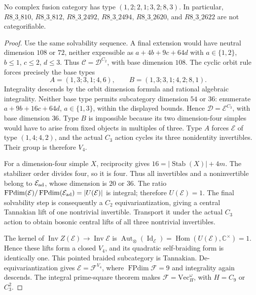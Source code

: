 \begin{theorem}\label{thm:m3-dimension216}
No complex fusion category has type $(1,2;2,1;3,2;8,3)$.
In particular, $R8\_3\_810$, $R8\_3\_812$, $R8\_3\_2492$,
$R8\_3\_2494$, $R8\_3\_2620$, and $R8\_3\_2622$ are not categorifiable.
\end{theorem}
\begin{proof}
Use the same solvability sequence. A final extension would have neutral
dimension $108$ or $72$, neither expressible as $a+4b+9c+64d$ with
$a\in\{1,2\}$, $b\le1$, $c\le2$, $d\le3$. Thus
$\mathcal C=\mathcal D^{C_2}$, with base dimension $108$.
The cyclic orbit rule forces precisely the base types
\[
 A=(1,3;3,1;4,6),\qquad B=(1,3;3,1;4,2;8,1).
\]
Integrality descends by the orbit dimension formula and rational
algebraic integrality. Neither base type permits subcategory dimension
$54$ or $36$: enumerate $a+9b+16c+64d$, $a\in\{1,3\}$, within the
displayed bounds. Hence $\mathcal D=\mathcal E^{C_3}$, with base
dimension $36$. Type $B$ is impossible because its two dimension-four
simples would have to arise from fixed objects in multiples of three.
Type $A$ forces $\mathcal E$ of type $(1,4;4,2)$, and the actual
$C_3$ action cycles its three nonidentity invertibles. Their group is
therefore $V_4$.

For a dimension-four simple $X$, reciprocity gives
$16=|\operatorname{Stab}(X)|+4m$. The stabilizer order divides four,
so it is four. Thus all invertibles and a noninvertible belong to
$\mathcal E_{\rm ad}$, whose dimension is $20$ or $36$.
The ratio $\operatorname{FPdim}(\mathcal E)/
\operatorname{FPdim}(\mathcal E_{\rm ad})=|U(\mathcal E)|$ is integral;
therefore $U(\mathcal E)=1$.
The final solvability step is consequently a $C_2$ equivariantization,
giving a central Tannakian lift of one nontrivial invertible. Transport
it under the actual $C_3$ action to obtain bosonic central lifts of all
three nontrivial invertibles.

The kernel of $\operatorname{Inv}Z(\mathcal E)\to
\operatorname{Inv}\mathcal E$ is
$\operatorname{Aut}_{\otimes}(\operatorname{Id}_{\mathcal E})
=\operatorname{Hom}(U(\mathcal E),\mathbb C^\times)=1$.
Hence these lifts form a closed $V_4$, and its quadratic self-braiding
form is identically one. This pointed braided subcategory is Tannakian.
De-equivariantization gives $\mathcal E=\mathcal F^{V_4}$, where
$\operatorname{FPdim}\mathcal F=9$ and integrality again descends.
The integral prime-square theorem \cite{ENO,EGNO} makes
$\mathcal F=\mathrm{Vec}_H^\omega$, with $H=C_9$ or $C_3^2$.


\end{proof}
